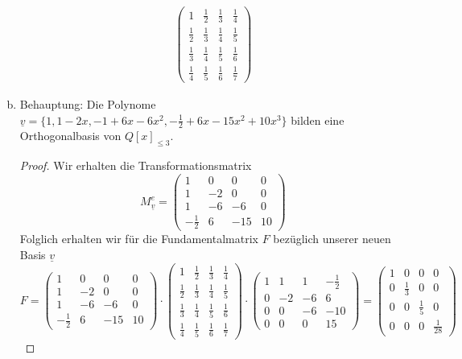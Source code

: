 \documentclass{article}
\begin{document}
\begin{enumerate}[(a)]
\begin{align*}
\begin{pmatrix}
                1 & \frac{1}{2} & \frac{1}{3} & \frac{1}{4}\\[0.5em]
                \frac{1}{2} & \frac{1}{3} & \frac{1}{4} & \frac{1}{5}\\[0.5em]
                \frac{1}{3} & \frac{1}{4} & \frac{1}{5} & \frac{1}{6}\\[0.5em]
                \frac{1}{4} & \frac{1}{5} & \frac{1}{6} & \frac{1}{7}
            \end{pmatrix}
        \end{align*}
        \item Behauptung: Die Polynome $\underline{v} = \{1, 1-2x, -1+6x - 6x^2, -\frac{1}{2} + 6x - 15x^2 + 10 x^3\}$ bilden eine Orthogonalbasis von $Q[x]_{\leq 3}$.
        \begin{proof}
        Wir erhalten die Transformationsmatrix 
        $$M_{\underline{v}}^{e} = \begin{pmatrix}
            1 & 0 & 0 & 0\\[0.5em]
            1 & -2 & 0 & 0\\[0.5em]
            1 & -6 & -6 & 0\\[0.5em]
            -\frac{1}{2} & 6 &-15 &10
        \end{pmatrix}$$
        Folglich erhalten wir für die Fundamentalmatrix $F$ bezüglich unserer neuen Basis $\underline{v}$
        $$F = \begin{pmatrix}
            1 & 0 & 0 & 0\\[0.5em]
            1 & -2 & 0 & 0\\[0.5em]
            1 & -6 & -6 & 0\\[0.5em]
            -\frac{1}{2} & 6 &-15 &10
        \end{pmatrix} 
        \cdot 
        \begin{pmatrix}
            1 & \frac{1}{2} & \frac{1}{3} & \frac{1}{4}\\[0.5em]
            \frac{1}{2} & \frac{1}{3} & \frac{1}{4} & \frac{1}{5}\\[0.5em]
            \frac{1}{3} & \frac{1}{4} & \frac{1}{5} & \frac{1}{6}\\[0.5em]
            \frac{1}{4} & \frac{1}{5} & \frac{1}{6} & \frac{1}{7}
        \end{pmatrix} 
        \cdot 
        \begin{pmatrix}
            1 & 1 & 1 & -\frac{1}{2}\\[0.5em]
            0 & -2 & -6 & 6\\[0.5em]
            0 & 0 & -6 & -10\\[0.5em]
            0 & 0 & 0 &15
        \end{pmatrix}
        =
        \begin{pmatrix}
            1 & 0 & 0 & 0\\[0.5em]
            0 & \frac{1}{3} & 0 & 0\\[0.5em]
            0 & 0 & \frac{1}{5} & 0\\[0.5em]
            0 & 0 & 0 & \frac{1}{28}
        \end{pmatrix}
        $$
        \end{proof}
    \end{enumerate}
\end{document}
